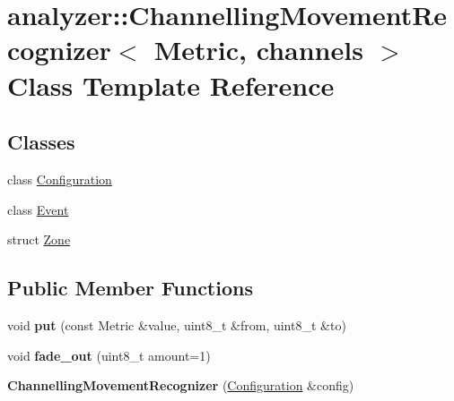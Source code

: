 \hypertarget{classanalyzer_1_1_channelling_movement_recognizer}{}\section{analyzer\+::Channelling\+Movement\+Recognizer$<$ Metric, channels $>$ Class Template Reference}
\label{classanalyzer_1_1_channelling_movement_recognizer}
\subsection*{Classes}
\begin{DoxyCompactItemize}
\item 
class \mbox{\hyperlink{classanalyzer_1_1_channelling_movement_recognizer_1_1_configuration}{Configuration}}
\item 
class \mbox{\hyperlink{classanalyzer_1_1_channelling_movement_recognizer_1_1_event}{Event}}
\item 
struct \mbox{\hyperlink{structanalyzer_1_1_channelling_movement_recognizer_1_1_zone}{Zone}}
\end{DoxyCompactItemize}
\subsection*{Public Member Functions}
\begin{DoxyCompactItemize}
\item 
\mbox{\label{classanalyzer_1_1_channelling_movement_recognizer_a8dfe878ba191578897f5c1f79cfd2981}} 
void {\bfseries put} (const Metric \&value, uint8\+\_\+t \&from, uint8\+\_\+t \&to)
\item 
\mbox{\label{classanalyzer_1_1_channelling_movement_recognizer_a8c74b611ae3579cae2c0668e616e98c0}} 
void {\bfseries fade\+\_\+out} (uint8\+\_\+t amount=1)
\item 
\mbox{\label{classanalyzer_1_1_channelling_movement_recognizer_a60951ec4f587d343421aee165486abd0}} 
{\bfseries Channelling\+Movement\+Recognizer} (\mbox{\hyperlink{classanalyzer_1_1_channelling_movement_recognizer_1_1_configuration}{Configuration}} \&config)
\end{DoxyCompactItemize}
